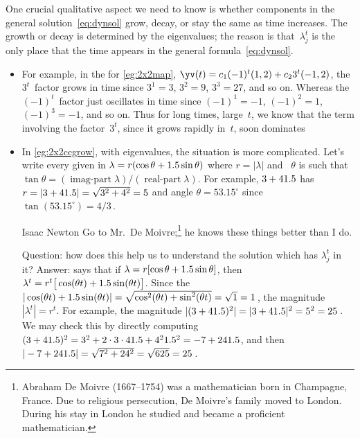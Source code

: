 One crucial qualitative aspect we need to know is whether components in the general solution~\eqref{eq:dynsol} grow, decay, or stay the same  as time increases.
The growth or decay is determined by the eigenvalues;
the reason is that~\(\lambda_j^t\) is the only place that the time appears in the general formula~\eqref{eq:dynsol}.
\begin{itemize}
\item For example, in the  for \cref{eg:2x2map}, \(\yv(t)=c_1(-1)^t(1,2)+c_23^t(-1,2)\), the \(3^t\)~factor grows in time since \(3^1=3\), \(3^2=9\), \(3^3=27\), and so on.
Whereas the \((-1)^t\)~factor just oscillates in time since \((-1)^1=-1\), \((-1)^2=1\), \((-1)^3=-1\), and so on.
Thus for long times, large~\(t\), we know that the term involving the factor~\(3^t\), since it grows rapidly in~\(t\), soon dominates 

\item In \cref{eg:2x2ccgrow}, with  eigenvalues, the situation is more complicated.
Let's write every given  in  
\(\lambda=r(\cos\theta+1.5\sin\theta)\) where  \(r=|\lambda|\) and ~\(\theta\) is such that \(\tan\theta=(\operatorname{imag-part}\lambda)/(\operatorname{real-part}\lambda)\).
For example, \(3+41.5\) has  \(r =|3+41.5| =\sqrt{3^2+4^2} =5\) and angle \(\theta =53.15^\circ\) since \(\tan(53.15^\circ) =4/3\)\,.

\begin{quoted}{Isaac Newton}
Go to Mr.~De Moivre;\footnote{Abraham De Moivre (1667--1754) was a mathematician born in Champagne, France.  Due to religious persecution, De Moivre's family moved to London.  During his stay in London he studied and became a proficient mathematician.} he knows these things better than I do.
\end{quoted}


Question: how does this help us to understand the solution which has \(\lambda_j^t\) in it?
Answer:  says that if \(\lambda=r[\cos\theta+1.5\sin\theta]\), then \(\lambda^t=r^t\big[\cos(\theta t)+1.5\sin(\theta t)\big]\).
Since the  \(|\cos(\theta t)+1.5\sin(\theta t)|=\sqrt{\cos^2(\theta t)+\sin^2(\theta t)}=\sqrt1=1\)\,, the magnitude \(|\lambda^t|=r^t\).
For example, the magnitude \(|(3+41.5)^2| =|3+41.5|^2 =5^2 =25\)\,. 
We may check this by directly computing \((3+41.5)^2 =3^2+2\cdot3\cdot41.5+4^21.5^2 =-7+241.5\), and then \(|-7+241.5| =\sqrt{7^2+24^2} =\sqrt{625} =25\)\,.


\end{itemize}
